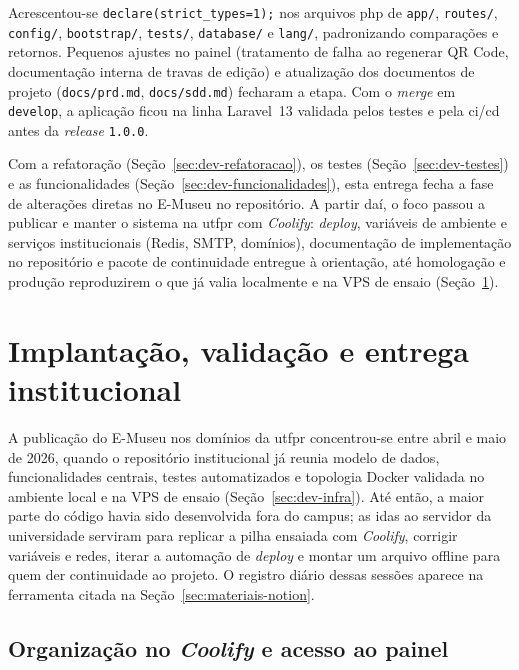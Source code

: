 Acrescentou-se \texttt{declare(strict\_types=1);} nos arquivos \acrshort{php} de \texttt{app/}, \texttt{routes/}, \texttt{config/}, \texttt{bootstrap/}, \texttt{tests/}, \texttt{database/} e \texttt{lang/}, padronizando comparações e retornos. Pequenos ajustes no painel (tratamento de falha ao regenerar QR Code, documentação interna de travas de edição) e atualização dos documentos de projeto (\texttt{docs/prd.md}, \texttt{docs/sdd.md}) fecharam a etapa. Com o \textit{merge} em \texttt{develop}, a aplicação ficou na linha Laravel~13 validada pelos testes e pela \acrfull{ci/cd} antes da \textit{release} \texttt{1.0.0}.

Com a refatoração (Seção~\ref{sec:dev-refatoracao}), os testes (Seção~\ref{sec:dev-testes}) e as funcionalidades (Seção~\ref{sec:dev-funcionalidades}), esta entrega fecha a fase de alterações diretas no E-Museu no repositório. A partir daí, o foco passou a publicar e manter o sistema na \acrshort{utfpr} com \textit{Coolify}: \textit{deploy}, variáveis de ambiente e serviços institucionais (Redis, SMTP, domínios), documentação de implementação no repositório e pacote de continuidade entregue à orientação, até homologação e produção reproduzirem o que já valia localmente e na VPS de ensaio (Seção~\ref{sec:dev-deploy}).


\section{Implantação, validação e entrega institucional}\label{sec:dev-deploy}

A publicação do E-Museu nos domínios da \acrshort{utfpr} concentrou-se entre abril e maio de 2026, quando o repositório institucional já reunia modelo de dados, funcionalidades centrais, testes automatizados e topologia Docker validada no ambiente local e na VPS de ensaio (Seção~\ref{sec:dev-infra}). Até então, a maior parte do código havia sido desenvolvida fora do campus; as idas ao servidor da universidade serviram para replicar a pilha ensaiada com \textit{Coolify}, corrigir variáveis e redes, iterar a automação de \textit{deploy} e montar um arquivo offline para quem der continuidade ao projeto. O registro diário dessas sessões aparece na ferramenta citada na Seção~\ref{sec:materiais-notion}.


\subsection{Organização no \textit{Coolify} e acesso ao painel}\label{sec:dev-deploy-coolify}

